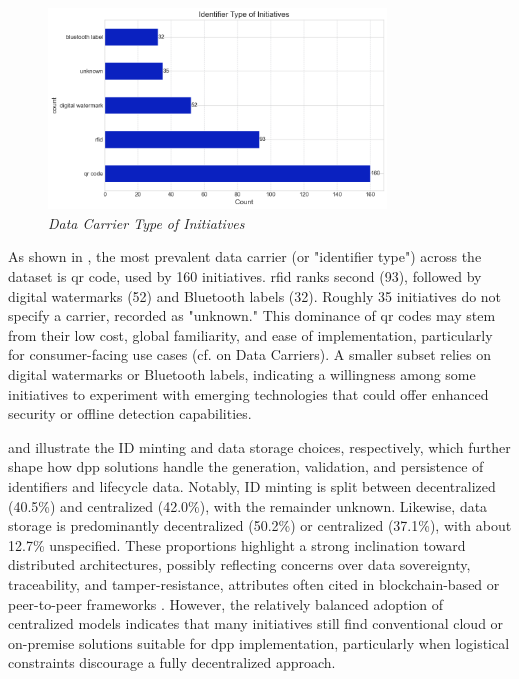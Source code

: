 \begin{figure}[H]
  \centering
  \includegraphics[width=0.8\textwidth]{figures/initiatives_data_carrier.png}
  \caption{%
    \textit{Data Carrier Type of Initiatives} 
  }
  \label{fig:initiatives_data_carrier}
\end{figure}

As shown in , the most prevalent data carrier (or "identifier type") across the dataset is \ac{qr} code, used by 160 initiatives. \ac{rfid} ranks second (93), followed by digital watermarks (52) and Bluetooth labels (32). Roughly 35 initiatives do not specify a carrier, recorded as "unknown." This dominance of \ac{qr} codes may stem from their low cost, global familiarity, and ease of implementation, particularly for consumer-facing use cases (cf. on Data Carriers). A smaller subset relies on digital watermarks or Bluetooth labels, indicating a willingness among some initiatives to experiment with emerging technologies that could offer enhanced security or offline detection capabilities.

 and  illustrate the ID minting and data storage choices, respectively, which further shape how \ac{dpp} solutions handle the generation, validation, and persistence of identifiers and lifecycle data. Notably, ID minting is split between decentralized (40.5\%) and centralized (42.0\%), with the remainder unknown. Likewise, data storage is predominantly decentralized (50.2\%) or centralized (37.1\%), with about 12.7\% unspecified. These proportions highlight a strong inclination toward distributed architectures, possibly reflecting concerns over data sovereignty, traceability, and tamper-resistance, attributes often cited in blockchain-based or peer-to-peer frameworks \autocite{Narayanan.2016}. However, the relatively balanced adoption of centralized models indicates that many initiatives still find conventional cloud or on-premise solutions suitable for \ac{dpp} implementation, particularly when logistical constraints discourage a fully decentralized approach.

